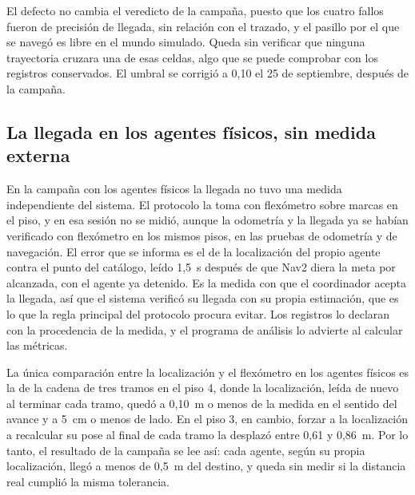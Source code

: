 El defecto no cambia el veredicto de la campaña, puesto que los cuatro fallos fueron de precisión de llegada, sin relación con el trazado, y el pasillo por el que se navegó es libre en el mundo simulado. Queda sin verificar que ninguna trayectoria cruzara una de esas celdas, algo que se puede comprobar con los registros conservados. El umbral se corrigió a 0,10 el 25 de septiembre, después de la campaña.

\subsection{La llegada en los agentes físicos, sin medida externa}
\label{sec:lim-llegada}

En la campaña con los agentes físicos la llegada no tuvo una medida independiente del sistema. El protocolo la toma con flexómetro sobre marcas en el piso, y en esa sesión no se midió, aunque la odometría y la llegada ya se habían verificado con flexómetro en los mismos pisos, en las pruebas de odometría y de navegación. El error que se informa es el de la localización del propio agente contra el punto del catálogo, leído 1,5~s después de que Nav2 diera la meta por alcanzada, con el agente ya detenido. Es la medida con que el coordinador acepta la llegada, así que el sistema verificó su llegada con su propia estimación, que es lo que la regla principal del protocolo procura evitar. Los registros lo declaran con la procedencia de la medida, y el programa de análisis lo advierte al calcular las métricas.

La única comparación entre la localización y el flexómetro en los agentes físicos es la de la cadena de tres tramos en el piso 4, donde la localización, leída de nuevo al terminar cada tramo, quedó a 0,10~m o menos de la medida en el sentido del avance y a 5~cm o menos de lado. En el piso 3, en cambio, forzar a la localización a recalcular su pose al final de cada tramo la desplazó entre 0,61 y 0,86~m. Por lo tanto, el resultado de la campaña se lee así: cada agente, según su propia localización, llegó a menos de 0,5~m del destino, y queda sin medir si la distancia real cumplió la misma tolerancia.
